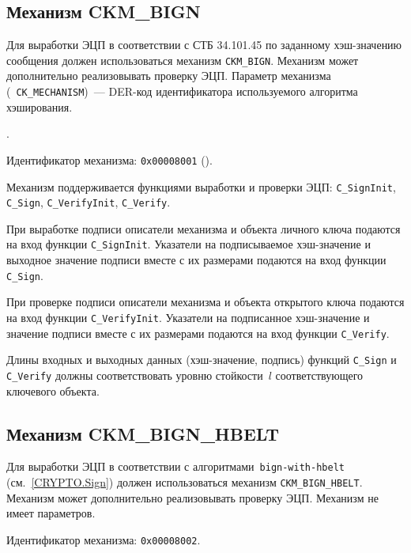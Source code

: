 
\subsection{Механизм CKM\_BIGN}

Для выработки ЭЦП в соответствии с СТБ 34.101.45 по заданному хэш-значению 
сообщения должен использоваться механизм \verb|CKM_BIGN|. Механизм может 
дополнительно реализовывать проверку ЭЦП. 
%
Параметр механизма (~\verb|CK_MECHANISM|)~--- DER-код идентификатора используемого 
алгоритма хэширования.

.

Идентификатор механизма: \texttt{0x00008001} 
(). 

Механизм поддерживается функциями выработки и проверки ЭЦП: 
\verb|C_SignInit|, \verb|C_Sign|, \verb|C_VerifyInit|, \verb|C_Verify|.

При выработке подписи описатели механизма и объекта
личного ключа подаются на вход функции \verb|C_SignInit|.
Указатели на подписываемое хэш-значение и выходное значение подписи
вместе с их размерами подаются на вход функции \verb|C_Sign|.

При проверке подписи описатели механизма и объекта
открытого ключа подаются на вход функции \verb|C_VerifyInit|.
Указатели на подписанное хэш-значение и значение подписи
вместе с их размерами подаются на вход функции \verb|C_Verify|.

Длины входных и выходных данных (хэш-значение, подпись) функций
\verb|C_Sign| и \verb|C_Verify| должны соответствовать
уровню стойкости~$l$ соответствующего ключевого объекта.

\subsection{Механизм CKM\_BIGN\_HBELT}

Для выработки ЭЦП в соответствии с алгоритмами~\texttt{bign-with-hbelt} 
(см.~\ref{CRYPTO.Sign}) должен использоваться механизм \verb|CKM_BIGN_HBELT|. 
Механизм может дополнительно реализовывать проверку ЭЦП. 
%
Механизм не имеет параметров.

Идентификатор механизма: \texttt{0x00008002}.

